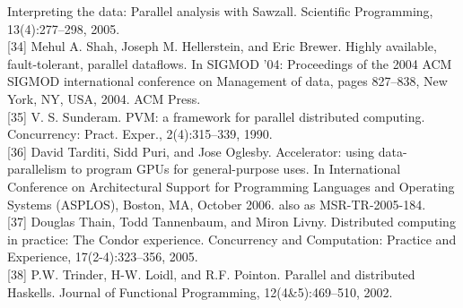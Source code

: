 \documentclass[
]{article}
\begin{document}
Interpreting the data: Parallel analysis with Sawzall. Scientific
Programming, 13(4):277--298, 2005.\\
{[}34{]} Mehul A. Shah, Joseph M. Hellerstein, and Eric Brewer. Highly
available, fault-tolerant, parallel dataflows. In SIGMOD '04:
Proceedings of the 2004 ACM SIGMOD international conference on
Management of data, pages 827--838, New York, NY, USA, 2004. ACM
Press.\\
{[}35{]} V. S. Sunderam. PVM: a framework for parallel distributed
computing. Concurrency: Pract. Exper., 2(4):315--339, 1990.\\
{[}36{]} David Tarditi, Sidd Puri, and Jose Oglesby. Accelerator: using
data-parallelism to program GPUs for general-purpose uses. In
International Conference on Architectural Support for Programming
Languages and Operating Systems (ASPLOS), Boston, MA, October 2006. also
as MSR-TR-2005-184.\\
{[}37{]} Douglas Thain, Todd Tannenbaum, and Miron Livny. Distributed
computing in practice: The Condor experience. Concurrency and
Computation: Practice and Experience, 17(2-4):323--356, 2005.\\
{[}38{]} P.W. Trinder, H-W. Loidl, and R.F. Pointon. Parallel and
distributed Haskells. Journal of Functional Programming,
12(4\&5):469--510, 2002.
\end{document}
